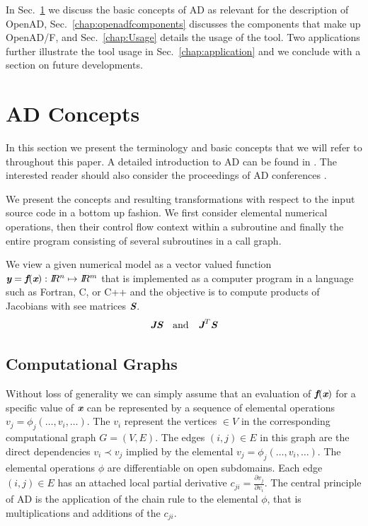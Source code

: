 \documentclass{book}
\newcommand{\OpenADF}{OpenAD/F}
\newcommand{\OpenAD}{OpenAD}
\newcommand{\R}{I\!\!R}
\newcommand{\bmf}{\mbox{\bf\em f}}
\newcommand{\bmJ}{\mbox{\bf\em J}}
\newcommand{\bmS}{\mbox{\bf\em S}}
\newcommand{\bmx}{\mbox{\bf\em x}}
\newcommand{\bmy}{\mbox{\bf\em y}}
\newcommand{\refsec}[1]{{Sec.~\ref{#1}}}
\begin{document}
In \refsec{chap:ADIntro} we discuss the basic concepts of AD as relevant for 
the description of \OpenAD, \refsec{chap:openadfcomponents} discusses the components 
that make up \OpenADF, and \refsec{chap:Usage} details the usage of the tool. 
Two applications further illustrate the tool usage in \refsec{chap:application} and 
we conclude with a section on future developments.

\chapter{AD Concepts}\label{chap:ADIntro}

In this section we present the terminology and basic concepts that 
we will refer to throughout this paper. 
A detailed introduction to AD can be found in \cite{Gri00}.
The interested reader should also consider the proceedings of AD 
conferences \cite{CG91,BBCG96,CFG+01,BCH+06}.

We present the concepts and resulting transformations 
with respect to the input source code 
in a bottom up fashion.  
We first consider elemental numerical operations, 
then their control flow context within a subroutine and finally the entire program 
consisting of several subroutines in a call graph. 

We view a given numerical model as a 
vector valued function $\bmy=\bmf(\bmx): \R^n\mapsto \R^m$ that is implemented 
as a computer program in a language such as Fortran, C, or C++ and the objective is to  
compute products of Jacobians with see matrices $\bmS$.
\begin{equation}\label{eqn:JacVecProds}
\bmJ \bmS \quad \mbox{and} \quad \bmJ^T \bmS
\end{equation}
\section{Computational Graphs} \label{sec:computationalGraphs}

Without loss of generality we can simply assume that an evaluation of $\bmf(\bmx)$ for  
a specific value of $\bmx$ can be represented by a sequence of 
elemental operations $v_j=\phi_j(\ldots,v_i,\ldots)$. 
The $v_i$ represent the vertices $\in V$ in the corresponding computational 
graph $G=(V,E)$. The edges $(i,j)\in E$ in this graph are the direct dependencies 
$v_i\prec v_j$ implied by the elemental $v_j=\phi_j(\ldots,v_i,\ldots)$.
The elemental operations $\phi$ are differentiable on open subdomains. 
Each edge $(i,j)\in E$ has an attached local partial derivative 
$c_{ji}=\frac{\partial v_j}{\partial v_i}$. 
The central principle of AD is 
the application of the chain rule to the elemental $\phi$, that is 
multiplications and additions of the  $c_{ji}$.  
\end{document}
